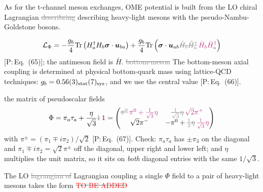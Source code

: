\documentclass[11pt,a4paper]{article}
\newcommand{\tagP}[1]{\textcolor{blue!65!black}{\textsf{\small[P:\,#1]}}}
\newcommand{\todo}{\textcolor{red}{TO BE ADDED}}
\newcommand{\ai}[1]{\textcolor{aicolor}{#1}}
\newcommand{\aifix}[2]{\textcolor{gray}{\sout{#1}} \textcolor{aicolor}{#2}}
\newcommand{\aifixm}[2]{\textcolor{gray}{\text{\sout{$#1$}}}\,\textcolor{aicolor}{#2}}
\newcommand{\ai}[1]{#1}
\newcommand{\aifix}[2]{#2}
\newcommand{\aifixm}[2]{#2}
\begin{document}
As for the t-channel meson exchanges, OME potential is built from the LO chiral Lagrangian \aifix{describring}{describing} heavy-light mesons with the pseudo-Nambu-Goldstone bosons.

\[
	\mathcal{L}_{\Phi} = -\frac{g_b}{4}\mathrm{Tr}\left(H_a^\dagger H_b \bm{\sigma}\cdot \bm{u}_{ba}\right) + \frac{g_b}{4}\mathrm{Tr}\left(\bm{\sigma}\cdot\bm{u}_{ab}\aifixm{\hat H_b \hat H_a^\dagger}{\bar H_b\bar H_a^\dagger}\right)
\]
\ai{\tagP{Eq.~(65)}; the antimeson field is $\bar H$.} \aifix{bottom-meson}{The bottom-meson} axial coupling is determined at physical bottom-quark mass using lattice-QCD techniques\ai{: $g_b=0.56(3)_{\rm stat}(7)_{\rm sys}$, and we use the central value \tagP{Eq.~(66)}}.

the matrix of pseudoscalar fields
\[
	\Phi = \pi_a\tau_a + \frac{\eta}{\sqrt{3}}\aifixm{1}{\bm 1} = \begin{pmatrix}
		\aifixm{\pi^0}{\pi^0+\frac{1}{\sqrt3}\eta} & \aifixm{\frac{1}{\sqrt{3}}\eta}{\sqrt2\pi^+}          \\
		\sqrt{2}\pi^-                              & -\pi^0+\aifixm{\frac{1}{3}\eta}{\frac{1}{\sqrt3}\eta}
	\end{pmatrix}
\]
\ai{with $\pi^\pm=(\pi_1\mp i\pi_2)/\sqrt2$ \tagP{Eq.~(67)}. Check: $\pi_a\tau_a$ has $\pm\pi_3$ on the diagonal and $\pi_1\mp i\pi_2=\sqrt2\pi^\pm$ off the diagonal, upper right and lower left; and $\eta$ multiplies the unit matrix, so it sits on \emph{both} diagonal entries with the same $1/\sqrt3$.}

The LO \aifix{lagrangian of}{Lagrangian coupling} a single $\Phi$ field to \ai{a} pair of heavy-light mesons takes \ai{the} form \aifix{\todo}{}
\end{document}
